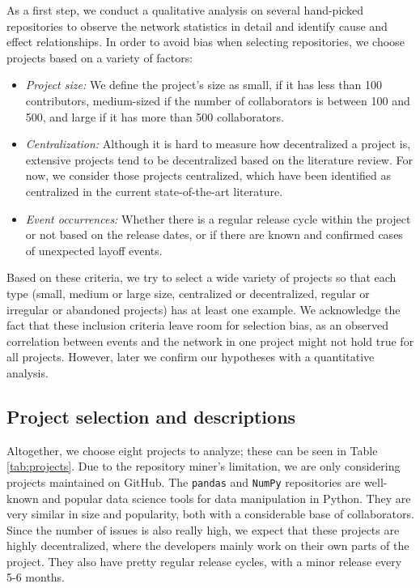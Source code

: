 As a first step, we conduct a qualitative analysis on several hand-picked repositories to observe the network statistics in detail and identify cause and effect relationships. In order to avoid bias when selecting repositories, we choose projects based on a variety of factors:

\begin{itemize}
    \item \textit{Project size:} We define the project's size as small, if it has less than 100 contributors, medium-sized if the number of collaborators is between 100 and 500, and large if it has more than 500 collaborators.
    \item \textit{Centralization:} Although it is hard to measure how decentralized a project is, extensive projects tend to be decentralized based on the literature review. For now, we consider those projects centralized, which have been identified as centralized in the current state-of-the-art literature. 
    \item \textit{Event occurrences:} Whether there is a regular release cycle within the project or not based on the release dates, or if there are known and confirmed cases of unexpected layoff events.
\end{itemize}

Based on these criteria, we try to select a wide variety of projects so that each type (small, medium or large size, centralized or decentralized, regular or irregular or abandoned projects) has at least one example. We acknowledge the fact that these inclusion criteria leave room for selection bias, as an observed correlation between events and the network in one project might not hold true for all projects. However, later we confirm our hypotheses with a quantitative analysis.

\subsection{Project selection and descriptions}

Altogether, we choose eight projects to analyze; these can be seen in Table \ref{tab:projects}. Due to the repository miner's limitation, we are only considering projects maintained on GitHub. The \texttt{pandas} and \texttt{NumPy} repositories are well-known and popular data science tools for data manipulation in Python. They are very similar in size and popularity, both with a considerable base of collaborators. Since the number of issues is also really high, we expect that these projects are highly decentralized, where the developers mainly work on their own parts of the project. They also have pretty regular release cycles, with a minor release every 5-6 months.

